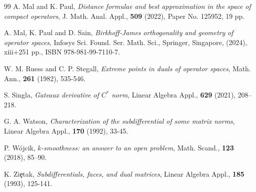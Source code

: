 \documentclass{amsart}
\theoremstyle{definition}
\theoremstyle{remark}
\numberwithin{equation}{section}
\begin{document}
\begin{thebibliography}{99}
 A. Mal and K. Paul, \textit{Distance formulae and best approximation in the space of compact operators}, J. Math. Anal. Appl., \textbf{509} (2022), Paper No. 125952, 19 pp.
		

 A. Mal, K. Paul and D. Sain, \textit{Birkhoff-James orthogonality and geometry of operator spaces}, Infosys Sci. Found. Ser. Math. Sci., Springer, Singapore, (2024), xiii+251 pp., ISBN 978-981-99-7110-7.
		
		
	 W. M. Ruess and C. P. Stegall, \textit{Extreme points in duals of operator spaces}, Math. Ann., \textbf{261} (1982), 535-546.
			
			

 S. Singla, \textit{Gateaux derivative of $C^*$ norm}, Linear Algebra Appl., \textbf{629} (2021), 208–218.
	

 G. A. Watson, \textit{Characterization of the subdifferential of some matrix norms}, Linear Algebra Appl., \textbf{170} (1992), 33-45.

	 P. W\'ojcik, \textit{$k$-smoothness: an answer to an open problem}, Math. Scand., \textbf{123} (2018), 85–90.
			
			 K. Zi\c{e}tak, \textit{Subdifferentials, faces, and dual matrices}, Linear Algebra Appl., \textbf{185} (1993), 125-141.	
	\end{thebibliography}
\end{document}
